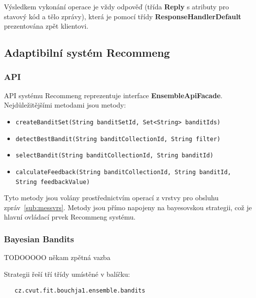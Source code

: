 \documentclass[thesis=M,czech]{FITthesis}[2014/05/07]
\begin{document}
Výsledkem vykonání operace je vždy odpověď (třída \textbf{Reply} s atributy pro stavový kód a tělo zprávy), která je pomocí třídy \textbf{ResponseHandlerDefault} prezentována zpět klientovi.

\subsection{Adaptibilní systém Recommeng}

\subsubsection{API}
API systému Recommeng reprezentuje interface \textbf{EnsembleApiFacade}. Nejdůležitějšími metodami jsou metody:

\begin{itemize}
	\item \texttt{createBanditSet(String banditSetId, Set<String> banditIds)}
	\item \texttt{detectBestBandit(String banditCollectionId, String filter)}
	\item \texttt{selectBandit(String banditCollectionId, String banditId)}
	\item \texttt{calculateFeedback(String banditCollectionId, String banditId, String feedbackValue)}			
\end{itemize}

Tyto metody jsou volány prostřednictvím operací z vrstvy pro obsluhu zpráv~\ref{sub:messvrs}. Metody jsou přímo napojeny na bayesovskou strategii, což je hlavní ovládací prvek Recommeng systému.

\subsubsection{Bayesian Bandits}

TODOOOOO někam zpětná vazba

Strategii řeší tří třídy umístěné v balíčku:

\begin{verbatim}
   cz.cvut.fit.bouchja1.ensemble.bandits
\end{verbatim}
\end{document}
